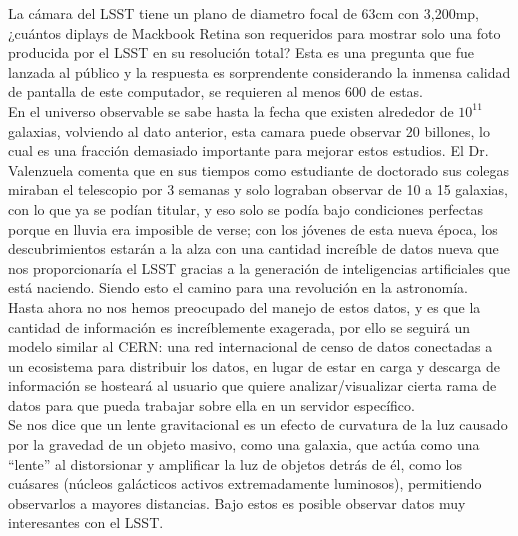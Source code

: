 \documentclass{article}
\begin{document}
La cámara del LSST tiene un plano de diametro focal de 63cm con 3,200mp, ¿cuántos diplays de Mackbook Retina son requeridos para mostrar solo una foto producida por el LSST en su resolución total? Esta es una pregunta que fue lanzada al público y la respuesta es sorprendente considerando la inmensa calidad de pantalla de este computador, se requieren al menos 600 de estas.\\

En el universo observable se sabe hasta la fecha que existen alrededor de $10^11$ galaxias, volviendo al dato anterior, esta camara puede observar 20 billones, lo cual es una fracción demasiado importante para mejorar estos estudios.
El Dr. Valenzuela comenta que en sus tiempos como estudiante de doctorado sus colegas miraban el telescopio por 3 semanas y solo lograban observar de 10 a 15 galaxias, con lo que ya se podían titular, y eso solo se podía bajo condiciones perfectas porque en lluvia era imposible de verse; con los jóvenes de esta nueva época, los descubrimientos estarán a la alza con una cantidad increíble de datos nueva que nos proporcionaría el LSST gracias a la generación de inteligencias artificiales que está naciendo. Siendo esto el camino para una revolución en la astronomía.\\

Hasta ahora no nos hemos preocupado del manejo de estos datos, y es que la cantidad de información es increíblemente exagerada, por ello se seguirá un modelo similar al CERN: una red internacional de censo de datos conectadas a un ecosistema para distribuir los datos, en lugar de estar en carga y descarga de información se hosteará al usuario que quiere analizar/visualizar cierta rama de datos para que pueda trabajar sobre ella en un servidor específico.\\

Se nos dice que un lente gravitacional es un efecto de curvatura de la luz causado por la gravedad de un objeto masivo, como una galaxia, que actúa como una “lente” al distorsionar y amplificar la luz de objetos detrás de él, como los cuásares (núcleos galácticos activos extremadamente luminosos), permitiendo observarlos a mayores distancias. Bajo estos es posible observar datos muy interesantes con el LSST.\\
\end{document}
